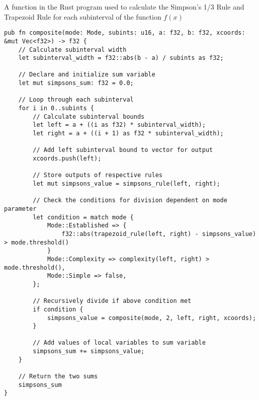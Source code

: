 \documentclass[../IA.tex]{subfiles}
\begin{document}
\begin{listing}[H]
\centering
{}
\caption{A function in the Rust program used to calculate the Simpson's 1/3 Rule and Trapezoid Rule for each subinterval of the function \(f(x)\)}
\label{lst:rust_composite}
\begin{verbatim}
pub fn composite(mode: Mode, subints: u16, a: f32, b: f32, xcoords: &mut Vec<f32>) -> f32 {
    // Calculate subinterval width
    let subinterval_width = f32::abs(b - a) / subints as f32;

    // Declare and initialize sum variable
    let mut simpsons_sum: f32 = 0.0;

    // Loop through each subinterval
    for i in 0..subints {
        // Calculate subinterval bounds
        let left = a + ((i as f32) * subinterval_width);
        let right = a + ((i + 1) as f32 * subinterval_width);

        // Add left subinterval bound to vector for output
        xcoords.push(left);

        // Store outputs of respective rules
        let mut simpsons_value = simpsons_rule(left, right);

        // Check the conditions for division dependent on mode parameter
        let condition = match mode {
            Mode::Established => {
                f32::abs(trapezoid_rule(left, right) - simpsons_value) > mode.threshold()
            }
            Mode::Complexity => complexity(left, right) > mode.threshold(),
            Mode::Simple => false,
        };

        // Recursively divide if above condition met
        if condition {
            simpsons_value = composite(mode, 2, left, right, xcoords);
        }

        // Add values of local variables to sum variable
        simpsons_sum += simpsons_value;
    }

    // Return the two sums
    simpsons_sum
}
\end{verbatim}
\end{listing}
\end{document}
